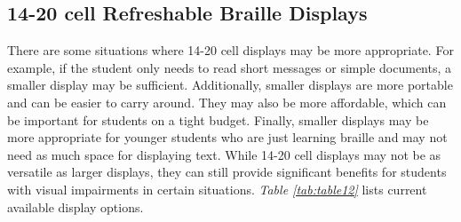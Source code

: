 \pagebreak
\hypertarget{few-cell-refreshable-braille-displays}{}\subsection{14-20 cell Refreshable Braille
 Displays}\label{few-cell-refreshable-braille-displays}
There are some situations where 14-20 cell displays may be more appropriate. For example, if the student only needs to read short messages or simple documents, a smaller display may be sufficient. Additionally, smaller displays are more portable and can be easier to carry around. They may also be more affordable, which can be important for students on a tight budget. Finally, smaller displays may be more appropriate for younger students who are just learning braille and may not need as much space for displaying text. While 14-20 cell displays may not be as versatile as larger displays, they can still provide significant benefits for students with visual impairments in certain situations. \textit{Table \ref{tab:table12}} lists current available display options.
